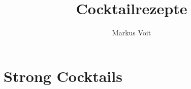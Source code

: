 \documentclass[
  DIV=11,%
  pagesize,%
  fontsize=11pt,%
  paper=a4,%
  numbers=noenddot,
]{scrartcl}
\title{Cocktailrezepte}
\author{Markus Voit}
\begin{document}
\maketitle

\tableofcontents
\clearpage

\section{Strong Cocktails}
\newpage{}
\newpage{}
\end{document}
